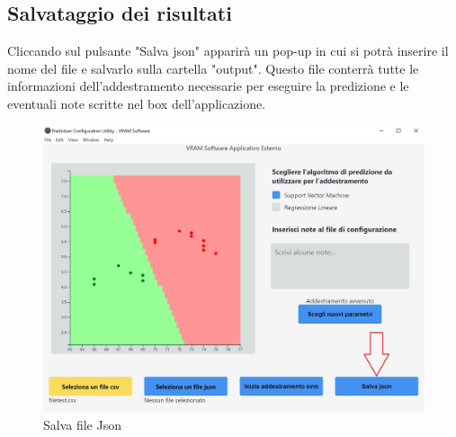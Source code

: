 	\subsection{Salvataggio dei risultati}
	Cliccando sul pulsante "Salva json" apparirà un pop-up in cui si potrà inserire il nome del file e salvarlo sulla cartella "output". Questo file conterrà tutte le informazioni dell'addestramento necessarie per eseguire la predizione e le eventuali note scritte nel box dell'applicazione.
	\begin{figure}[H] 	
		\begin{center}
			\includegraphics[width=\linewidth]{img/4-2.jpg}
		\end{center}
		\caption{Salva file Json}	
	\end{figure}
	
